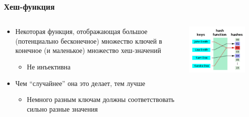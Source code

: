 \documentclass[xetex,mathserif,serif]{beamer}
\begin{document}
    \begin{frame}
        \frametitle{Хеш-функция}
        \begin{columns}
            \begin{column}{0.75\textwidth}
                \begin{itemize}
                    \item Некоторая функция, отображающая большое (потенциально бесконечное) множество ключей в конечное (и маленькое) множество хеш-значений
                    \begin{itemize}
                        \item Не инъективна
                    \end{itemize}
                    \item Чем ``случайнее'' она это делает, тем лучше
                    \begin{itemize}
                        \item Немного разным ключам должны соответствовать сильно разные значения
                    \end{itemize}
                \end{itemize}
            \end{column}
            \begin{column}{0.25\textwidth}
                \begin{center}
                    \includegraphics[width=0.95\textwidth]{hashfunction.png}
                \end{center}
            \end{column}
        \end{columns}

\end{frame}
\end{document}
